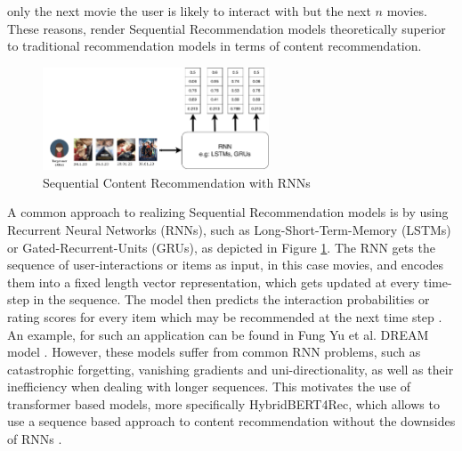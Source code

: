 \documentclass{Academic}
\begin{document}
only the next movie the user is likely to interact with but the next $n$ movies. These reasons, render Sequential Recommendation models theoretically superior to traditional recommendation models in terms of content recommendation. \\
    \begin{figure}[ht!]
        \centering
        \includegraphics[width=0.6\textwidth]{images/rnn_seq.pdf}
        \caption{Sequential Content Recommendation with RNNs \cite{yuDynamicRecurrentModel2016}}
        \label{fig:seqRNN}
    \end{figure}
    A common approach to realizing Sequential Recommendation models is by using Recurrent Neural Networks (RNNs), such as Long-Short-Term-Memory (LSTMs) or Gated-Recurrent-Units (GRUs), as depicted in Figure \ref{fig:seqRNN}. The RNN gets the sequence of user-interactions or items as input, in this case movies, and encodes them into a fixed length vector representation, which gets updated at every time-step in the sequence. The model then predicts the interaction probabilities or rating scores for every item which may be recommended at the next time step \cite{yuDynamicRecurrentModel2016}. An example, for such an application can be found in Fung Yu et al. DREAM model \cite{yuDynamicRecurrentModel2016}. However, these models suffer from common RNN problems, such as catastrophic forgetting, vanishing gradients and uni-directionality, as well as their inefficiency when dealing with longer sequences. This motivates the use of transformer based models, more specifically HybridBERT4Rec, which allows to use a sequence based approach to content recommendation without the downsides of RNNs \cite{channarongHybridBERT4RecHybridContentBased2022}.

    \FloatBarrier
\end{document}
